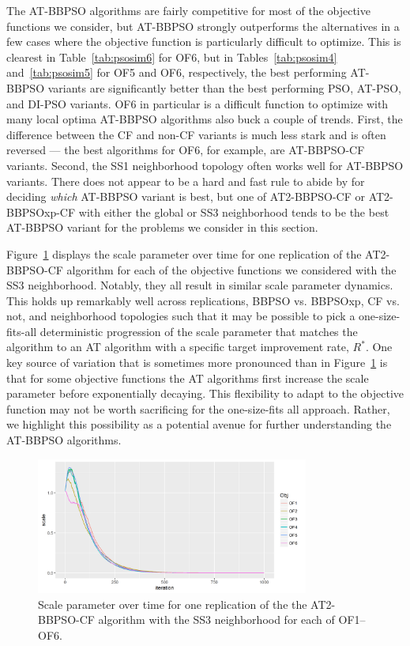 \documentclass[cmbright]{staauth}
\begin{document}
The AT-BBPSO algorithms are fairly competitive for most of the objective functions we consider, but AT-BBPSO strongly outperforms the alternatives in a few cases where the objective function is particularly difficult to optimize. This is clearest in Table~\ref{tab:psosim6} for OF6, but in Tables~\ref{tab:psosim4} and~\ref{tab:psosim5} for OF5 and OF6, respectively, the best performing AT-BBPSO variants are significantly better than the best performing PSO, AT-PSO, and DI-PSO variants. OF6 in particular is a difficult function to optimize with many local optima AT-BBPSO algorithms also buck a couple of trends. First, the difference between the CF and non-CF variants is much less stark and is often reversed --- the best algorithms for OF6, for example, are AT-BBPSO-CF variants. Second, the SS1 neighborhood topology often works well for AT-BBPSO variants. There does not appear to be a hard and fast rule to abide by for deciding \emph{which} AT-BBPSO variant is best, but one of AT2-BBPSO-CF or AT2-BBPSOxp-CF with either the global or SS3 neighborhood tends to be the best AT-BBPSO variant for the problems we consider in this section.

Figure~\ref{fig:scale} displays the scale parameter over time for one replication of the AT2-BBPSO-CF algorithm for each of the objective functions we considered with the SS3 neighborhood. Notably, they all result in similar scale parameter dynamics. This holds up remarkably well across replications, BBPSO vs. BBPSOxp, CF vs. not, and neighborhood topologies such that it may be possible to pick a one-size-fits-all deterministic progression of the scale parameter that matches the algorithm to an AT algorithm with a specific target improvement rate, $R^*$. One key source of variation that is sometimes more pronounced than in Figure~\ref{fig:scale} is that for some objective functions the AT algorithms first increase the scale parameter before exponentially decaying. This flexibility to adapt to the objective function may not be worth sacrificing for the one-size-fits all approach. Rather, we highlight this possibility as a potential avenue for further understanding the AT-BBPSO algorithms.

\begin{figure}[p]
\centering
\includegraphics[width=0.8\textwidth]{scaleplot.png}
\caption{Scale parameter over time for one replication of the the AT2-BBPSO-CF algorithm with the SS3 neighborhood for each of OF1--OF6.}
\label{fig:scale}
\end{figure}
\end{document}
